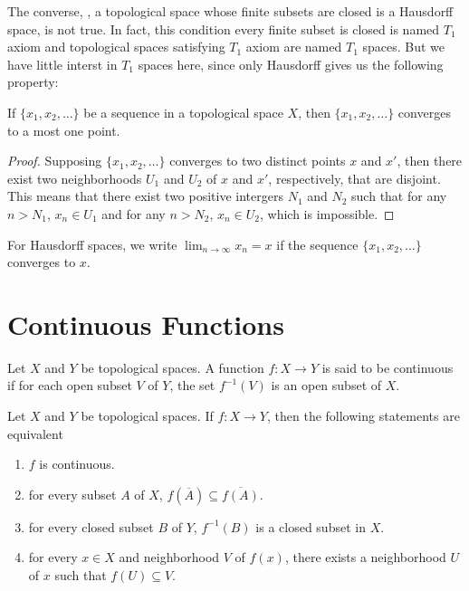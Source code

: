 The converse, \ie, a topological space whose finite subsets are closed is a 
Hausdorff space, is not true. 
In fact, this condition every finite subset is closed is named $T_1$ axiom 
and topological spaces satisfying $T_1$ axiom are named $T_1$ spaces. 
But we have little interst in $T_1$ spaces here, since only Hausdorff gives 
us the following property: 
\begin{thm}
If $\{x_1, x_2, \ldots\}$ be a sequence in a topological space $X$, then 
$\{x_1, x_2, \ldots\}$ converges to a most one point. 
\end{thm}
\begin{proof}
Supposing $\{x_1, x_2, \ldots\}$ converges to two distinct points $x$ and 
$x'$, then there exist two neighborhoods $U_1$ and $U_2$ of $x$ and $x'$, 
respectively, that are disjoint. 
This means that there exist two positive intergers $N_1$ and $N_2$ such that 
for any $n > N_1$, $x_n \in U_1$ and for any $n > N_2$, $x_n \in U_2$, which 
is impossible. 
\end{proof}

For Hausdorff spaces, we write $\lim_{n \to \infty} x_n = x$ if the sequence 
$\{x_1, x_2, \ldots\}$ converges to $x$. 

\section{Continuous Functions}
\begin{defn}
\label{def:topology:continuous_function}
Let $X$ and $Y$ be topological spaces. A function $f: X \to Y$ is said to be 
continuous if for each open subset $V$ of $Y$, the set $f^{-1}(V)$ is an 
open subset of $X$. 
\end{defn}

\begin{thm}
Let $X$ and $Y$ be topological spaces. If $f: X \to Y$, then the following 
statements are equivalent 
\begin{enumerate}
    \item $f$ is continuous. 
    \item for every subset $A$ of $X$, $f(\overline{A}) \subseteq 
    \overline{f(A)}$. 
    \item for every closed subset $B$ of $Y$, $f^{-1}(B)$ is a closed subset 
    in $X$. 
    \item for every $x \in X$ and neighborhood $V$ of $f(x)$, there exists 
    a neighborhood $U$ of $x$ such that $f(U) \subseteq V$. 
\end{enumerate}
\end{thm}

